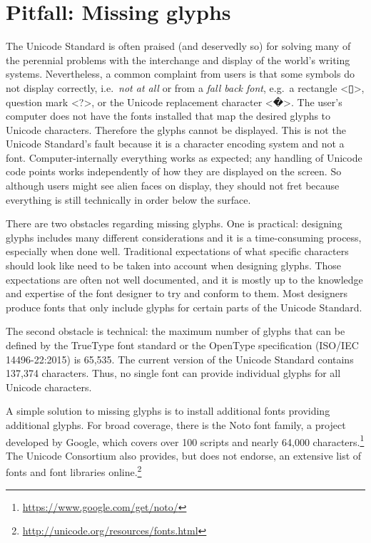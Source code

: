 \section{Pitfall: Missing glyphs}
\label{pitfall-missing-glyphs}

The Unicode Standard is often praised (and deservedly so) for solving many of
the perennial problems with the interchange and display of the world's writing
systems. Nevertheless, a common complaint from users is that some symbols do not display 
correctly, i.e.\ \textit{not at all} or from a \textit{fall back font}, e.g.\ a 
rectangle <▯>, question mark <?>, or the Unicode replacement character <�>. 
The user's computer does not have the fonts 
installed that map the desired glyphs to Unicode characters. Therefore the glyphs cannot be displayed.
This is not the Unicode Standard's fault because it is a character 
encoding system and not a font. Computer-internally everything works as expected; 
any handling of Unicode code points works independently of how they 
are displayed on the screen. So although users might see
alien faces on display, they should not fret because everything is still 
technically in order below the surface.

There are two obstacles regarding missing glyphs. One is practical: 
designing glyphs includes many different considerations and 
it is a time-consuming process, especially when done well. 
Traditional expectations of what specific characters should look like need
to be taken into account when designing glyphs. Those expectations are often not
well documented, and it is mostly up to the knowledge and expertise of the font
designer to try and conform to them. Most designers 
produce fonts that only include glyphs for certain parts of the Unicode
Standard. 

The second obstacle is technical: the maximum number of glyphs that can be 
defined by the TrueType font standard or the OpenType specification 
(ISO/IEC 14496-22:2015) is 65,535. The current version of the Unicode Standard 
contains 137,374 characters. Thus, no single font can provide individual 
glyphs for all Unicode characters.

A simple solution to missing glyphs is to install additional fonts
providing additional glyphs. For broad coverage, there is the Noto font family, a project developed by Google, 
which covers over 100 scripts and nearly 64,000 characters.\footnote{\url{https://www.google.com/get/noto/}} 
The Unicode Consortium also provides, but does not endorse, an extensive list of fonts and font libraries online.\footnote{\url{http://unicode.org/resources/fonts.html}}

